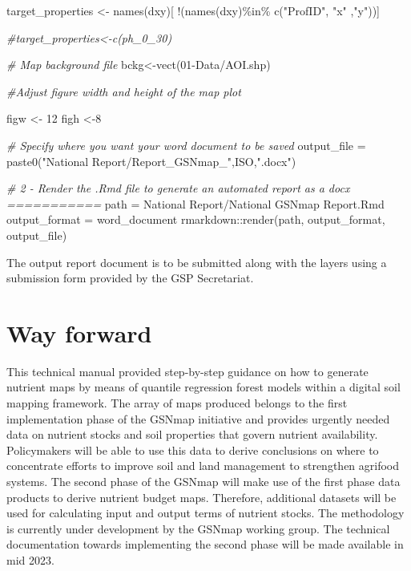\documentclass[
  10pt,
  b5paper,
  oneside]{book}
\newenvironment{Shaded}{\begin{snugshade}}{\end{snugshade}}
\newcommand{\CommentTok}[1]{\textcolor[rgb]{0.56,0.35,0.01}{\textit{#1}}}
\newcommand{\DecValTok}[1]{\textcolor[rgb]{0.00,0.00,0.81}{#1}}
\newcommand{\FunctionTok}[1]{\textcolor[rgb]{0.00,0.00,0.00}{#1}}
\newcommand{\NormalTok}[1]{#1}
\newcommand{\OtherTok}[1]{\textcolor[rgb]{0.56,0.35,0.01}{#1}}
\newcommand{\SpecialCharTok}[1]{\textcolor[rgb]{0.00,0.00,0.00}{#1}}
\newcommand{\StringTok}[1]{\textcolor[rgb]{0.31,0.60,0.02}{#1}}
\begin{document}
\begin{Shaded}
\begin{Highlighting}[]
\NormalTok{target\_properties }\OtherTok{\textless{}{-}} \FunctionTok{names}\NormalTok{(dxy)[ }\SpecialCharTok{!}\NormalTok{(}\FunctionTok{names}\NormalTok{(dxy)}\SpecialCharTok{\%in\%} \FunctionTok{c}\NormalTok{(}\StringTok{"ProfID"}\NormalTok{, }\StringTok{"x"}\NormalTok{ ,}\StringTok{"y"}\NormalTok{))]}

\CommentTok{\#target\_properties\textless{}{-}c(\textquotesingle{}ph\_0\_30\textquotesingle{})}

\CommentTok{\# Map background file}
\NormalTok{bckg}\OtherTok{\textless{}{-}}\FunctionTok{vect}\NormalTok{(}\StringTok{\textquotesingle{}01{-}Data/AOI.shp\textquotesingle{}}\NormalTok{)}

\CommentTok{\#Adjust figure width and height of the map plot}

\NormalTok{figw }\OtherTok{\textless{}{-}} \DecValTok{12}
\NormalTok{figh }\OtherTok{\textless{}{-}}\DecValTok{8}


\CommentTok{\# Specify where you want your word document to be saved}
\NormalTok{output\_file }\OtherTok{=} \FunctionTok{paste0}\NormalTok{(}\StringTok{"National Report/Report\_GSNmap\_"}\NormalTok{,ISO,}\StringTok{".docx"}\NormalTok{)}

\CommentTok{\# 2 {-} Render the .Rmd file to generate an automated report as a docx ===========}
\NormalTok{path }\OtherTok{=} \StringTok{\textquotesingle{}National Report/National GSNmap Report.Rmd\textquotesingle{}}
\NormalTok{output\_format }\OtherTok{=} \StringTok{\textquotesingle{}word\_document\textquotesingle{}}
\NormalTok{rmarkdown}\SpecialCharTok{::}\FunctionTok{render}\NormalTok{(path, output\_format, output\_file)}
\end{Highlighting}
\end{Shaded}

The output report document is to be submitted along with the layers using a submission form provided by the GSP Secretariat.

\hypertarget{way-forward}{%
\chapter{Way forward}\label{way-forward}}

This technical manual provided step-by-step guidance on how to generate nutrient maps by means of quantile regression forest models within a digital soil mapping framework. The array of maps produced belongs to the first implementation phase of the GSNmap initiative and provides urgently needed data on nutrient stocks and soil properties that govern nutrient availability. Policymakers will be able to use this data to derive conclusions on where to concentrate efforts to improve soil and land management to strengthen agrifood systems.
The second phase of the GSNmap will make use of the first phase data products to derive nutrient budget maps. Therefore, additional datasets will be used for calculating input and output terms of nutrient stocks. The methodology is currently under development by the GSNmap working group. The technical documentation towards implementing the second phase will be made available in mid 2023.
\end{document}
